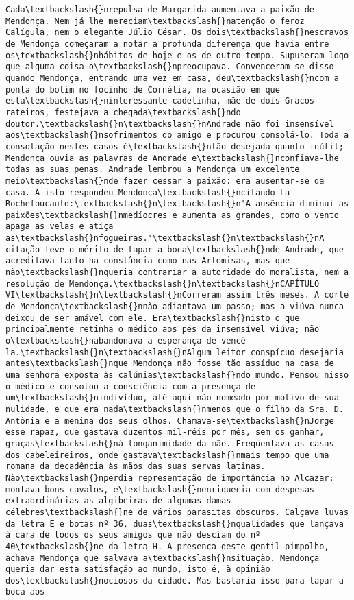 \documentclass[11pt]{article}
\begin{document}
\begin{Verbatim}[commandchars=\\\{\}]
Cada\textbackslash{}nrepulsa de Margarida aumentava a paixão de Mendonça. Nem já lhe mereciam\textbackslash{}natenção o feroz Calígula, nem o elegante Júlio César. Os dois\textbackslash{}nescravos de Mendonça começaram a notar a profunda diferença que havia entre os\textbackslash{}nhábitos de hoje e os de outro tempo. Supuseram logo que alguma coisa o\textbackslash{}npreocupava. Convenceram-se disso quando Mendonça, entrando uma vez em casa, deu\textbackslash{}ncom a ponta do botim no focinho de Cornélia, na ocasião em que esta\textbackslash{}ninteressante cadelinha, mãe de dois Gracos rateiros, festejava a chegada\textbackslash{}ndo doutor.\textbackslash{}n\textbackslash{}nAndrade não foi insensível aos\textbackslash{}nsofrimentos do amigo e procurou consolá-lo. Toda a consolação nestes casos é\textbackslash{}ntão desejada quanto inútil; Mendonça ouvia as palavras de Andrade e\textbackslash{}nconfiava-lhe todas as suas penas. Andrade lembrou a Mendonça um excelente meio\textbackslash{}nde fazer cessar a paixão: era ausentar-se da casa. A isto respondeu Mendonça\textbackslash{}ncitando La Rochefoucauld:\textbackslash{}n\textbackslash{}n'A ausência diminui as paixões\textbackslash{}nmedíocres e aumenta as grandes, como o vento apaga as velas e atiça as\textbackslash{}nfogueiras.'\textbackslash{}n\textbackslash{}nA citação teve o mérito de tapar a boca\textbackslash{}nde Andrade, que acreditava tanto na constância como nas Artemisas, mas que não\textbackslash{}nqueria contrariar a autoridade do moralista, nem a resolução de Mendonça.\textbackslash{}n\textbackslash{}nCAPÍTULO VI\textbackslash{}n\textbackslash{}nCorreram assim três meses. A corte de Mendonça\textbackslash{}nnão adiantava um passo; mas a viúva nunca deixou de ser amável com ele. Era\textbackslash{}nisto o que principalmente retinha o médico aos pés da insensível viúva; não o\textbackslash{}nabandonava a esperança de vencê-la.\textbackslash{}n\textbackslash{}nAlgum leitor conspícuo desejaria antes\textbackslash{}nque Mendonça não fosse tão assíduo na casa de uma senhora exposta às calúnias\textbackslash{}ndo mundo. Pensou nisso o médico e consolou a consciência com a presença de um\textbackslash{}nindivíduo, até aqui não nomeado por motivo de sua nulidade, e que era nada\textbackslash{}nmenos que o filho da Sra. D. Antônia e a menina dos seus olhos. Chamava-se\textbackslash{}nJorge esse rapaz, que gastava duzentos mil-réis por mês, sem os ganhar, graças\textbackslash{}nà longanimidade da mãe. Freqüentava as casas dos cabeleireiros, onde gastava\textbackslash{}nmais tempo que uma romana da decadência às mãos das suas servas latinas. Não\textbackslash{}nperdia representação de importância no Alcazar; montava bons cavalos, e\textbackslash{}nenriquecia com despesas extraordinárias as algibeiras de algumas damas célebres\textbackslash{}ne de vários parasitas obscuros. Calçava luvas da letra E e botas nº 36, duas\textbackslash{}nqualidades que lançava à cara de todos os seus amigos que não desciam do nº 40\textbackslash{}ne da letra H. A presença deste gentil pimpolho, achava Mendonça que salvava a\textbackslash{}nsituação. Mendonça queria dar esta satisfação ao mundo, isto é, à opinião dos\textbackslash{}nociosos da cidade. Mas bastaria isso para tapar a boca aos 
\end{Verbatim}
\end{document}
